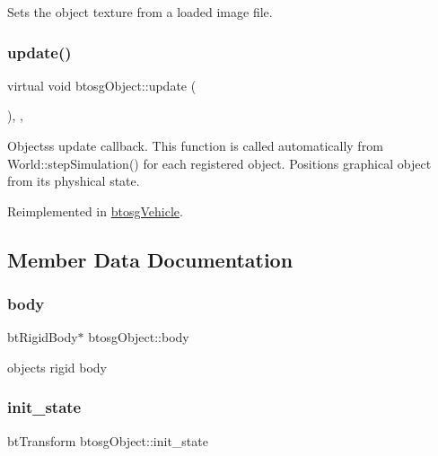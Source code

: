 Sets the object texture from a loaded image file. \mbox{\label{classbtosgObject_a342917817dfde62554f83da8e0d5110b}} 
\subsubsection{\texorpdfstring{update()}{update()}}
{\footnotesize\ttfamily virtual void btosg\+Object\+::update (\begin{DoxyParamCaption}{ }\end{DoxyParamCaption})\hspace{0.3cm}{\ttfamily [inline]}, {\ttfamily [virtual]}, {\ttfamily [inherited]}}

Objects\textquotesingle{}s update callback. This function is called automatically from World\+::step\+Simulation() for each registered object. Positions graphical object from its physhical state. 

Reimplemented in \mbox{\hyperlink{classbtosgVehicle_a5fd0f471df492ac232c9b772a28bd2b9}{btosg\+Vehicle}}.



\subsection{Member Data Documentation}
\mbox{\label{classbtosgObject_a64ccde0543c184ed1749fdb9c9699785}} 
\subsubsection{\texorpdfstring{body}{body}}
{\footnotesize\ttfamily bt\+Rigid\+Body$\ast$ btosg\+Object\+::body\hspace{0.3cm}{\ttfamily [inherited]}}



object\textquotesingle{}s rigid body 

\mbox{\label{classbtosgObject_a2dee023f311114e200df9b04c8c1b400}} 
\subsubsection{\texorpdfstring{init\_state}{init\_state}}
{\footnotesize\ttfamily bt\+Transform btosg\+Object\+::init\+\_\+state\hspace{0.3cm}{\ttfamily [inherited]}}



